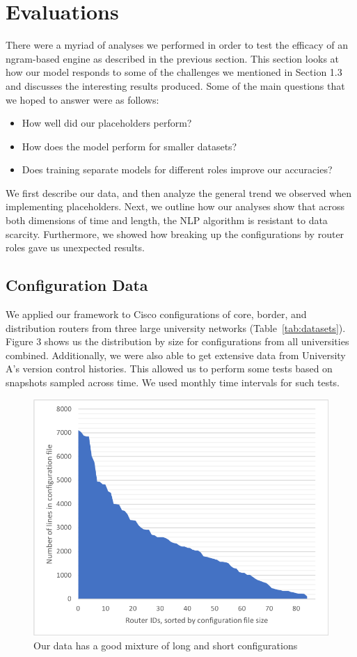 \section{Evaluations}

There were a myriad of analyses we performed in order to test the efficacy of an ngram-based engine as described in the previous section. This section looks at how our model responds to some of the challenges we mentioned in Section 1.3 and discusses the interesting results produced. Some of the main questions that we hoped to answer were as follows: 
\begin{itemize}
  \item How well did our placeholders perform?
  \item How does the model perform for smaller datasets?
  \item Does training separate models for different roles improve our accuracies?
\end{itemize}

 We first describe our data, and then analyze the general trend we observed when implementing placeholders. Next, we outline how our analyses show that across both dimensions of time and length, the NLP algorithm is resistant to data scarcity. Furthermore, we showed how breaking up the configurations by router roles gave us unexpected results.

\subsection{Configuration Data}

We applied our framework to Cisco configurations of core, border, and distribution routers from three large university networks (Table~\ref{tab:datasets}). Figure 3 shows us the distribution by size for configurations from all universities combined. Additionally, we were also able to get extensive data from University A's version control histories. This allowed us to perform some tests based on snapshots sampled across time. We used monthly time intervals for such tests.

\begin{figure}[H]
	\centering
	\includegraphics[width=5in]{config_sizes.png}
	\caption{Our data has a good mixture of long and short configurations}
\end{figure}

